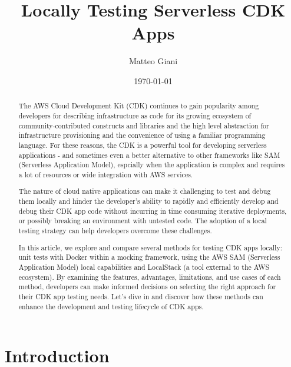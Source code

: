 \documentclass{article}
\title{Locally Testing Serverless CDK Apps}
\author{Matteo Giani}
\date{\today}
\begin{document}
\maketitle

\begin{abstract}

The AWS Cloud Development Kit (CDK) continues to gain popularity among developers for describing infrastructure as code for its growing ecosystem of community-contributed constructs and libraries and the high level abstraction for infrastructure provisioning and the convenience of using a familiar programming language. For these reasons, the CDK is a powerful tool for developing serverless applications - and sometimes even a better alternative to other frameworks like SAM (Serverless Application Model), espcially when the application is complex and requires a lot of resources or wide integration with AWS services.

The nature of cloud native applications can make it challenging to test and debug them locally and hinder the developer's ability to rapidly and efficiently develop and debug their CDK app code without incurring in time consuming iterative deployments, or possibly breaking an environment with untested code. The adoption of a local testing strategy can help developers overcome these challenges.




In this article, we explore and compare several methods for testing CDK apps locally: unit tests with Docker within a mocking framework, using the AWS SAM (Serverless Application Model) local capabilities and LocalStack (a tool external to the AWS ecosystem). By examining the features, advantages, limitations, and use cases of each method, developers can make informed decisions on selecting the right approach for their CDK app testing needs. Let's dive in and discover how these methods can enhance the development and testing lifecycle of CDK apps.

\end{abstract}

\section{Introduction}
\end{document}
